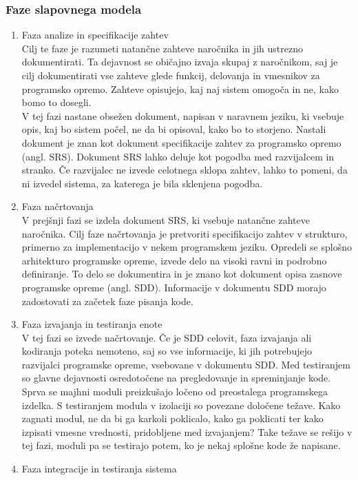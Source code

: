 \documentclass[a4paper,12pt,openright]{book}
\begin{document}
\subsubsection{Faze slapovnega modela}
\begin{enumerate}
    \item Faza analize in specifikacije zahtev \\
    Cilj te faze je razumeti natančne zahteve naročnika in jih ustrezno dokumentirati. Ta dejavnost se običajno izvaja skupaj z naročnikom, saj je cilj dokumentirati vse zahteve glede funkcij, delovanja in vmesnikov za programsko opremo. Zahteve opisujejo, kaj naj sistem omogoča in ne, kako bomo to dosegli. \\
    V tej fazi nastane obsežen dokument, napisan v naravnem jeziku, ki vsebuje opis, kaj bo sistem počel, ne da bi opisoval, kako bo to storjeno. Nastali dokument je znan kot dokument specifikacije zahtev za programsko opremo (angl. SRS). Dokument SRS lahko deluje kot pogodba med razvijalcem in stranko. Če razvijalec ne izvede celotnega sklopa zahtev, lahko to pomeni, da ni izvedel sistema, za katerega je bila sklenjena pogodba.
    \item Faza načrtovanja \\
     V prejšnji fazi se izdela dokument SRS, ki vsebuje natančne zahteve naročnika. Cilj faze načrtovanja je pretvoriti specifikacijo zahtev v strukturo, primerno za implementacijo v nekem programskem jeziku. Opredeli se splošno arhitekturo programske opreme, izvede delo na visoki ravni in podrobno deﬁniranje. To delo se dokumentira in je znano kot dokument opisa zasnove programske opreme (angl. SDD). Informacije v dokumentu SDD morajo zadostovati za začetek faze pisanja kode.
    \item Faza izvajanja in testiranja enote \\
    V tej fazi se izvede načrtovanje. Če je SDD celovit, faza izvajanja ali kodiranja poteka nemoteno, saj so vse informacije, ki jih potrebujejo razvijalci programske opreme, vsebovane v dokumentu SDD.
Med testiranjem so glavne dejavnosti osredotočene na pregledovanje in spreminjanje kode. Sprva se majhni moduli preizkušajo ločeno od preostalega programskega izdelka. S testiranjem modula v izolaciji so povezane določene težave. Kako zagnati modul, ne da bi ga karkoli poklicalo, kako ga poklicati ter kako izpisati vmesne vrednosti, pridobljene med izvajanjem? Take težave se rešijo v tej fazi, moduli pa se testirajo potem, ko je nekaj splošne kode že napisane.
    \item Faza integracije in testiranja sistema \\

\end{enumerate}
\end{document}
